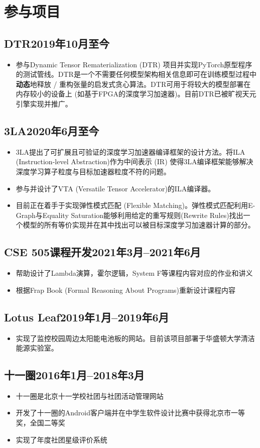 \documentclass{article}
\newcommand{\cvsubsection}[1]{\subsection*{\hspace{1.45em}#1}}
\begin{document}
\section*{参与项目}
\cvsubsection{DTR\hfill 2019年10月至今}
\begin{itemize}
    \setlength{\itemsep}{1pt}
    \setlength{\parskip}{0pt}
    \setlength{\parsep}{0pt}
    \item 参与Dynamic Tensor Rematerialization (DTR) 项目并实现PyTorch原型程序的测试管线。DTR是一个不需要任何模型架构相关信息即可在训练模型过程中\textbf{动态}地释放 / 重构张量的启发式贪心算法。DTR可用于将较大的模型部署在内存较小的设备上 (如基于FPGA的深度学习加速器)。目前DTR已被旷视天元引擎实现并推广。
\end{itemize}
\cvsubsection{3LA\hfill 2020年6月至今}
\begin{itemize}
    \setlength{\itemsep}{1pt}
    \setlength{\parskip}{0pt}
    \setlength{\parsep}{0pt}
    \item 3LA提出了可扩展且可验证的深度学习加速器编译框架的设计方法。将ILA (Instruction-level Abstraction)作为中间表示 (IR) 使得3LA编译框架能够解决深度学习算子粒度与目标加速器粒度不符的问题。
    \item 参与并设计了VTA (Versatile Tensor Accelerator)的ILA编译器。
    \item 目前正在着手于实现弹性模式匹配 (Flexible Matching)。弹性模式匹配利用E-Graph与Equality Saturation能够利用给定的重写规则(Rewrite Rules)找出一个模型的所有等价实现并在其中找出可以被目标深度学习加速器计算的部分。
\end{itemize}

\cvsubsection{CSE 505课程开发\hfill 2021年3月--2021年6月}
\begin{itemize}
    \setlength{\itemsep}{1pt}
    \setlength{\parskip}{0pt}
    \setlength{\parsep}{0pt}
    \item 帮助设计了Lambda演算，霍尔逻辑，System F等课程内容对应的作业和讲义
    \item 根据Frap Book (Formal Reasoning About Programs)重新设计课程内容
\end{itemize}

\cvsubsection{Lotus Leaf\hfill 2019年1月--2019年6月}
\begin{itemize}
    \setlength{\itemsep}{1pt}
    \setlength{\parskip}{0pt}
    \setlength{\parsep}{0pt}
    \item 实现了监控校园周边太阳能电池板的网站。目前该项目部署于华盛顿大学清洁能源实验室。
\end{itemize}

\cvsubsection{十一圈\hfill 2016年1月--2018年3月}
\begin{itemize}
    \setlength{\itemsep}{1pt}
    \setlength{\parskip}{0pt}
    \setlength{\parsep}{0pt}
    \item 十一圈是北京十一学校社团与社团活动管理网站
    \item 开发了十一圈的Android客户端并在中学生软件设计比赛中获得北京市一等奖，全国二等奖
    \item 实现了年度社团星级评价系统
\end{itemize}
\end{document}
